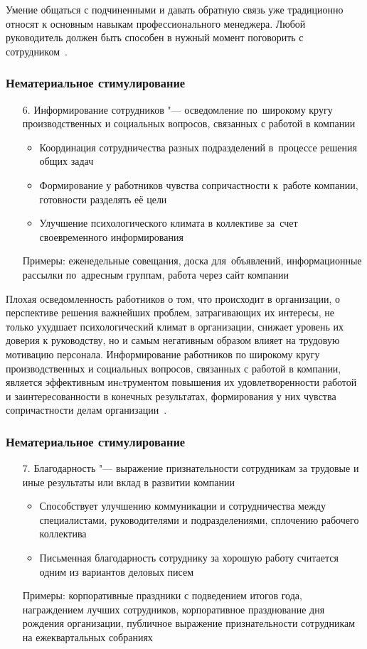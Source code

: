 \documentclass{../industrial-development}
\begin{document}
\lecturenotes

Умение общаться с подчиненными и давать  обратную связь уже традиционно относят  к основным навыкам профессионального менеджера.  Любой руководитель должен быть способен в нужный момент поговорить с сотрудником~\cite{VchemosobenIT}.

\begin{frame} \frametitle{Нематериальное стимулирование}
  \begin{itemize}
	\item[6.] \alert{Информирование сотрудников} "--- осведомление по~широкому кругу производственных и социальных вопросов, связанных с работой в компании
	 \begin{itemize}
		\item Координация сотрудничества разных подразделений в~процессе решения общих задач
	\item Формирование у работников чувства сопричастности к~работе компании, готовности разделять её цели
	\item Улучшение психологического климата в коллективе за~счет своевременного информирования
		\end{itemize}
	 Примеры: еженедельные совещания, доска для~объявлений, информационные рассылки по~адресным группам, работа через сайт компании
	  \end{itemize}
		\end{frame}
		
		\lecturenotes
		
Плохая осведомленность работников о том, что происходит в организации, о перспективе решения важнейших проблем, затрагивающих их интересы, не только ухудшает психологический климат в организации, снижает уровень их доверия к руководству, но и самым негативным образом влияет на трудовую мотивацию персонала. Информирование работников по широкому кругу производственных и социальных вопросов, связанных с работой в компании, является эффективным инcтрументом повышения их удовлетворенности работой и заинтересованности в конечных результатах, формирования у них чувства сопричастности делам организации~\cite{VchemosobenIT}.


\begin{frame} \frametitle{Нематериальное стимулирование}
		 \begin{itemize}
		\item[7.] \alert{Благодарность} "--- выражение признательности сотрудникам за трудовые и иные результаты или вклад в развитии компании
\begin{itemize}
\item Способствует улучшению коммуникации и сотрудничества между специалистами, руководителями и подразделениями, сплочению рабочего коллектива
\item Письменная благодарность сотруднику за хорошую работу  считается одним из вариантов деловых писем
 \end{itemize}
Примеры: корпоративные праздники с подведением итогов года, награждением лучших сотрудников, корпоративное празднование дня рождения организации, публичное выражение признательности сотрудникам на ежеквартальных собраниях			
  \end{itemize}
		\end{frame}
		
\end{document}
